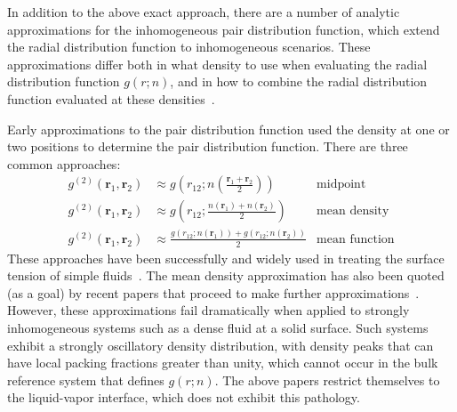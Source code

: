 \documentclass[letterpaper,twocolumn,amsmath,amssymb,pre,aps,10pt]{revtex4-1}
\newcommand{\rr}{\textbf{r}}
\begin{document}
In addition to the above exact approach, there are a number of
analytic approximations for the inhomogeneous pair distribution
function, which extend the radial distribution function to
inhomogeneous scenarios.  These approximations differ both in what
density to use when evaluating the radial distribution function
$g(r;n)$, and in how to combine the radial distribution function
evaluated at these densities~\cite{toxvaerd1973statistical}.

Early approximations to the pair distribution function used the
density at one or two positions to determine the pair distribution
function.  There are three common approaches:
\begin{align}
  g^{(2)}(\rr_1,\rr_2) &\approx
  g\left(r_{12}; n\left(\frac{\rr_1+\rr_2}{2}\right)\right)
     & \text{midpoint} \\
  g^{(2)}(\rr_1,\rr_2) &\approx
  g\left(r_{12}; \frac{n(\rr_1)+n(\rr_2)}{2}\right)
     & \text{mean density} \\
  g^{(2)}(\rr_1,\rr_2) &\approx
  \frac{g(r_{12};n(\rr_1))+g(r_{12};n(\rr_2))}{2}
     & \text{mean function}\label{eq:mean-function}
\end{align}
These approaches have been successfully and widely used in treating
the surface tension of simple fluids~\cite{pressing2003surface,
  salter2008statistical, bongiorno1975modified,
  toxvaerd1976hydrostatic, kalos1977structure, carey2008gradient,
  osborn1980monotonic, mccoy1981comparison, barrett2006some}.  The
mean density approximation has also been quoted (as a goal) by recent
papers that proceed to make further
approximations~\cite{gloor2007prediction, gross2009density}.  However,
these approximations fail dramatically when applied to strongly
inhomogeneous systems such as a dense fluid at a solid surface.  Such
systems exhibit a strongly oscillatory density distribution, with
density peaks that can have local packing fractions greater than
unity, which cannot occur in the bulk reference system that defines
$g(r; n)$.  The above papers restrict themselves to the liquid-vapor
interface, which does not exhibit this pathology.
\end{document}
